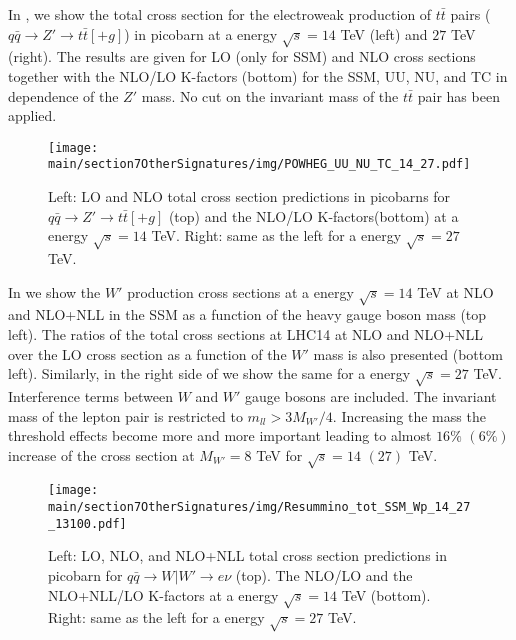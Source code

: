 In , we show the total cross section for the electroweak production of $t \bar t$ pairs 
($q \bar q \to Z' \to t \bar t [+g]$) in picobarn at a \com energy $\sqrt{s} = 14$ TeV (left) and $27$ TeV (right). 
The results are given for LO (only for SSM) and NLO cross sections together with the NLO/LO K-factors (bottom)
for the SSM, UU, NU, and TC in dependence of the $Z'$ mass.
No cut on the invariant mass of the $t \bar t$ pair has been applied.
\begin{figure}
\centering
{\texttt{[image: \\main/section7OtherSignatures/img/POWHEG\_UU\_NU\_TC\_14\_27.pdf]}}
\caption{ Left: LO and NLO total cross section predictions in picobarns for $q \bar q \to Z' \to t \bar t [+g]$ (top) 
 and the NLO/LO K-factors(bottom) at a \com energy $\sqrt{s}= 14$ TeV. Right: same as the left for a \com energy $\sqrt{s}= 27$ TeV. 
\label{fig:POWHEG_uu_nu_tc}}
\end{figure}

In  we show the  $W'$ production cross sections  at a \com energy $\sqrt{s} = 14$ TeV at NLO and NLO+NLL in the SSM as a function of the heavy gauge boson mass (top left). The ratios of the total cross sections at LHC14 at NLO and NLO+NLL over the LO cross section as a function of the $W'$ mass is also presented (bottom left).
Similarly, in the right side of   we show the same for a \com energy $\sqrt{s} = 27$ TeV.
 Interference terms between $W$ and $W'$ gauge bosons are included. The
 invariant mass of the lepton pair is restricted to $m_{ll}>3M_{W'}/4$. Increasing the mass the threshold effects become more and more important leading to almost $16\%$ $(6\%)$ increase of the cross section at $M_{W'} = 8$ TeV for $\sqrt{s} = 14$ $(27)$ TeV.
 
  \begin{figure}
\centering
{\texttt{[image: \\main/section7OtherSignatures/img/Resummino\_tot\_SSM\_Wp\_14\_27\_13100.pdf]}}
\caption{ Left: LO, NLO, and NLO+NLL total cross section predictions in picobarn for $q \bar q \to W|W' \to e  \nu$ (top). The NLO/LO and the NLO+NLL/LO K-factors at a \com energy $\sqrt{s}= 14$ TeV (bottom). Right: same as the left for a \com energy $\sqrt{s}= 27$ TeV. 
\label{fig:dilepton_ssm}}
\end{figure}


